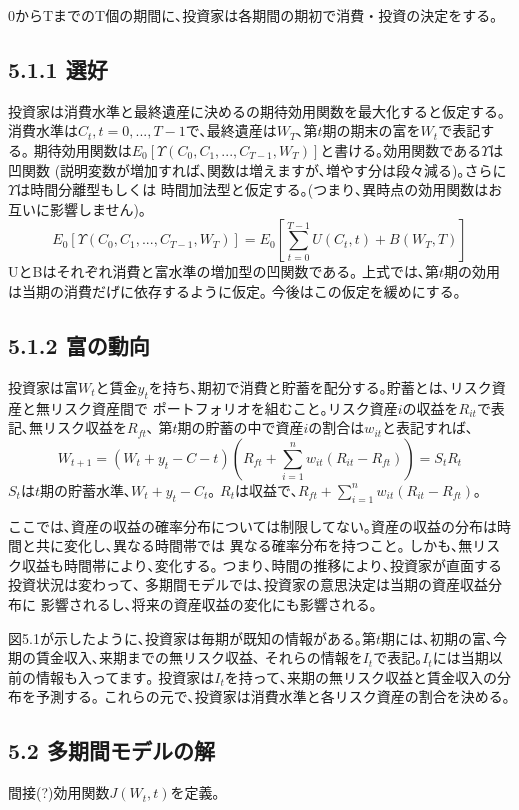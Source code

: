 \documentclass[uplatex,a4paper]{jsarticle}
\begin{document}
0からTまでのT個の期間に､投資家は各期間の期初で消費・投資の決定をする｡

\subsection*{5.1.1 選好}

投資家は消費水準と最終遺産に決めるの期待効用関数を最大化すると仮定する｡
消費水準は$C_t, t = 0,...,T-1$で､最終遺産は$W_T$､第$t$期の期末の富を$W_t$で表記する｡
期待効用関数は$E_0[\Upsilon(C_0,C_1,...,C_{T-1},W_T)]$と書ける｡効用関数である$\Upsilon$は凹関数
(説明変数が増加すれば､関数は増えますが､増やす分は段々減る)｡さらに$\Upsilon$は時間分離型もしくは
時間加法型と仮定する｡(つまり､異時点の効用関数はお互いに影響しません)｡
$$
E_0[\Upsilon(C_0,C_1,...,C_{T-1},W_T)] =
E_0[\sum_{t=0}^{T-1} U(C_t,t)+B(W_T,T)]
$$
UとBはそれぞれ消費と富水準の増加型の凹関数である｡
上式では､第$t$期の効用は当期の消費だげに依存するように仮定｡
今後はこの仮定を緩めにする｡


\subsection*{5.1.2 富の動向}

投資家は富$W_t$と賃金$y_t$を持ち､期初で消費と貯蓄を配分する｡貯蓄とは､リスク資産と無リスク資産間で
ポートフォリオを組むこと｡リスク資産$i$の収益を$R_{it}$で表記､無リスク収益を$R_{ft}$､
第$t$期の貯蓄の中で資産$i$の割合は$w_{it}$と表記すれば､
$$
W_{t+1} = (W_t + y_t - C-t) (R_{ft} + \sum_{i=1}^{n} w_{it} (R_{it} - R_{ft})) = S_t R_t
$$
$S_t$は$t$期の貯蓄水準､$W_t+y_t-C_t$｡
$R_t$は収益で､$R_{ft} + \sum_{i=1}^{n} w_{it} (R_{it} - R_{ft})$｡

ここでは､資産の収益の確率分布については制限してない｡資産の収益の分布は時間と共に変化し､異なる時間帯では
異なる確率分布を持つこと｡
しかも､無リスク収益も時間帯により､変化する｡
つまり､時間の推移により､投資家が直面する投資状況は変わって､ 多期間モデルでは､投資家の意思決定は当期の資産収益分布に
影響されるし､将来の資産収益の変化にも影響される｡

図5.1が示したように､投資家は毎期が既知の情報がある｡第$t$期には､初期の富､今期の賃金収入､来期までの無リスク収益､
それらの情報を$I_t$で表記｡$I_t$には当期以前の情報も入ってます｡
投資家は$I_t$を持って､来期の無リスク収益と賃金収入の分布を予測する｡
これらの元で､投資家は消費水準と各リスク資産の割合を決める｡
\subsection*{5.2 多期間モデルの解}
間接(?)効用関数$J(W_t,t)$を定義｡
\end{document}
